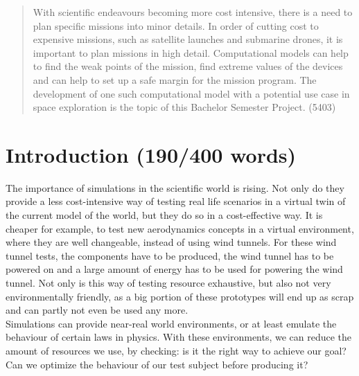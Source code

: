 \documentclass[conference,compsoc]{IEEEtran}
\begin{document}




\maketitle


\begin{abstract}
With scientific endeavours becoming more cost intensive, there is a need to plan specific missions into minor details. In order of cutting cost to expensive missions, such as satellite launches and submarine drones, it is important to plan missions in high detail. Computational models can help to find the weak points of the mission, find extreme values of the devices and can help to set up a safe margin for the mission program. The development of one such computational model with a potential use case in space exploration is the topic of this Bachelor Semester Project. (5403)
\end{abstract}


%
\IEEEpeerreviewmaketitle


\section{Introduction (190/400 words)}
The importance of simulations in the scientific world is rising. Not only do they provide a less cost-intensive way of testing real life scenarios in a virtual twin of the current model of the world, but they do so in a cost-effective way. It is cheaper for example, to test new aerodynamics concepts in a virtual environment, where they are well changeable, instead of using wind tunnels. For these wind tunnel tests, the components have to be produced, the wind tunnel has to be powered on and a large amount of energy has to be used for powering the wind tunnel. Not only is this way of testing resource exhaustive, but also not very environmentally friendly, as a big portion of these prototypes will end up as scrap and can partly not even be used any more.  \\
Simulations can provide near-real world environments, or at least emulate the behaviour of certain laws in physics. With these environments, we can reduce the amount of resources we use, by checking: is it the right way to achieve our goal? Can we optimize the behaviour of our test subject before producing it? 
\end{document}
